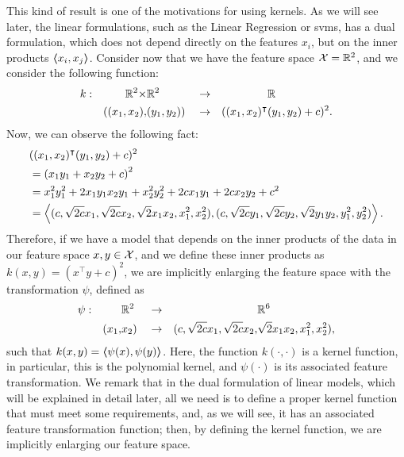 This kind of result is one of the motivations for using kernels. 
As we will see later, the linear formulations, such as the Linear Regression or \acrshort{svms}, has a dual formulation, which does not depend directly on the features $x_i$, but on the inner products $\bm{\left\langle} x_i, x_j \bm{\right\rangle}$.
Consider now that we have the feature space $\mathcal{X} = \mathbb{R}^2$, and we consider the following function:
\begin{equation}
    \begin{aligned}
        \nonumber
        k: & &\mathbb{R}^2 \times &\mathbb{R}^2 & &\to& &\mathbb{R} \\
        & &((x_1, x_2), & (y_1, y_2))   & &\to& ((x_1, x_2)^\intercal &(y_1, y_2) + c)^2 .
    \end{aligned}
\end{equation}
Now, we can observe the following fact:
\begin{equation}
    \nonumber
    \begin{aligned}
        &((x_1, x_2)^\intercal (y_1, y_2) + c)^2 \\
        &= \left(x_1 y_1 + x_2 y_2 + c \right)^2 \\
        &= x_1^2 y_1^2 + 2 x_1 y_1 x_2 y_1+ x_2^2 y_2^2 + 2 c x_1 y_1 + 2 c x_2 y_2 + c^2 \\
        &= \bm{\left\langle} (c, \sqrt{2c} x_1, \sqrt{2c} x_2, \sqrt{2} x_1 x_2, x_1^2, x_2^2), (c, \sqrt{2c} y_1, \sqrt{2c} y_2, \sqrt{2} y_1 y_2, y_1^2, y_2^2) \bm{\right\rangle}.
    \end{aligned}
\end{equation}
Therefore, if we have a model that depends on the inner products of the data in our feature space $x, y \in \mathcal{X}$, and we define these inner products as $k(x, y) = (x^\intercal y + c)^2$, we are implicitly enlarging the feature space with the transformation $\psi$, defined as
\begin{equation}
    \begin{aligned}
        \nonumber
        \psi: & &&\mathbb{R}^2 & &\to& &\mathbb{R}^6 \\
        & &(x_1,& x_2)& &\to& (c, \sqrt{2c} x_1, \sqrt{2c} x_2,& \sqrt{2} x_1 x_2, x_1^2, x_2^2) ,
    \end{aligned}
\end{equation}
such that $k(x, y) = \bm{\left\langle} \psi(x), \psi(y) \bm{\right\rangle}$.
%
Here, the function $k(\cdot, \cdot)$ is a kernel function, in particular, this is the polynomial kernel, and $\psi(\cdot)$ is its associated feature transformation. 
We remark that in the dual formulation of linear models, which will be explained in detail later, all we need is to define a proper kernel function that must meet some requirements, and, as we will see, it has an associated feature transformation function; then, by defining the kernel function, we are implicitly enlarging our feature space.




